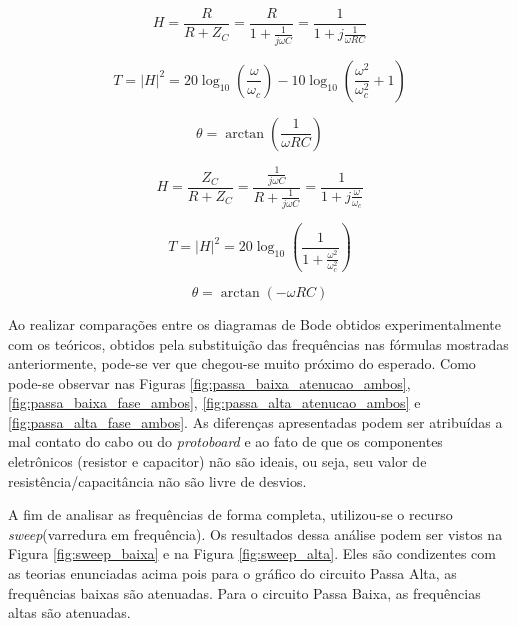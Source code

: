 \documentclass{article}
\begin{document}
\begin{equation}
    H =\frac{R}{R+ Z_{C}} = \frac{R}{1 + \frac{1}{j\omega C}} = \frac{1}{1 +j \frac{1}{\omega RC}}
    \label{eq:transf_passa_alta}
\end{equation}

\begin{equation}
    T = \left | H \right |^{2} = 20\log_{10}(\frac{\omega }{\omega_{c}}) - 10\log_{10}(\frac{\omega^{2}}{\omega_{c}^{2}} + 1)
    \label{eq:atenuacao_passa_alta}
\end{equation}

\begin{equation}
    \theta = \arctan (\frac{1}{\omega RC})
    \label{eq:fase_passa_alta}
\end{equation}

\begin{equation}
    H = \frac{Z_{C}}{R + Z_{C}} = \frac{\frac{1}{j\omega C}}{R + \frac{1}{j\omega C}} = \frac{1}{1 + j \frac{\omega}{\omega_{c}}}
    \label{eq:transf_passa_baixa}
\end{equation}

\begin{equation}
    T = \left | H \right |^{2}= 20\log_{10}(\frac{1}{1 + \frac{\omega^{2}}{\omega_{c}^{2}}})
    \label{eq:atenuacao_passa_baixa}
\end{equation}

\begin{equation}
    \theta = \arctan (-\omega RC)
    \label{eq:fase_passa_baixa}
\end{equation}

Ao realizar comparações entre os diagramas de Bode obtidos experimentalmente com os teóricos, obtidos pela substituição das frequências nas fórmulas mostradas anteriormente, pode-se ver que chegou-se muito próximo do esperado. Como pode-se observar nas Figuras \ref{fig:passa_baixa_atenucao_ambos}, \ref{fig:passa_baixa_fase_ambos}, \ref{fig:passa_alta_atenucao_ambos} e \ref{fig:passa_alta_fase_ambos}. As diferenças apresentadas podem ser atribuídas a mal contato do cabo ou do \emph{protoboard} e ao fato de que os componentes eletrônicos (resistor e capacitor) não são ideais, ou seja, seu valor de resistência/capacitância não são livre de desvios.

A fim de analisar as frequências de forma completa, utilizou-se o recurso \emph{sweep}(varredura em frequência). Os resultados dessa análise podem ser vistos na Figura \ref{fig:sweep_baixa} e na Figura \ref{fig:sweep_alta}. Eles são condizentes com as teorias enunciadas acima pois para o gráfico do circuito Passa Alta, as frequências baixas são atenuadas. Para o circuito Passa Baixa, as frequências altas são atenuadas.
\end{document}
